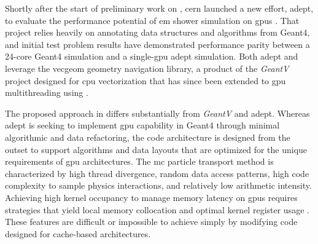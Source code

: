 Shortly after the start of preliminary work on \celeritas, \acs{cern} launched a
new effort, \acs{adept}, to evaluate the performance potential of \ac{em}
shower simulation on \acp{gpu} \cite{andrei_gheata_adept_2020}. That project
relies heavily on annotating data structures and algorithms from Geant4, and
initial test problem results \cite{andrei_gheata_adept_2021,hahnfield_2021} have
demonstrated performance parity between a 24-core Geant4 simulation and a
single-\ac{gpu} \acs{adept} simulation. Both \acs{adept} and \celeritas leverage
the \acs{vecgeom} geometry navigation library, a product of the \emph{GeantV}
project designed for \ac{cpu} vectorization that has since been extended to
\ac{gpu} multithreading using \cuda \cite{apostolakis_towards_2015}.

The proposed approach in \celeritas differs substantially from \emph{GeantV} and
\acs{adept}. Whereas \acs{adept} is seeking to implement \ac{gpu} capability in
Geant4 through minimal algorithmic and data refactoring, the \celeritas code
architecture is designed from the outset to support algorithms and data layouts
that are
optimized for the unique requirements of \ac{gpu} architectures.
The \ac{mc} particle transport method is characterized by high thread
divergence, random data access patterns, high code complexity to sample physics
interactions, and relatively low arithmetic intensity.  Achieving high kernel
occupancy to manage memory latency on \acp{gpu} requires strategies that yield
local memory collocation and optimal kernel register usage
\cite{hamilton_continuous-energy_2019}.  These features are
difficult or impossible to achieve simply by modifying code designed
for cache-based architectures.